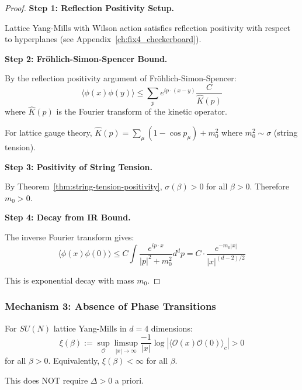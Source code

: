 \begin{proof}
\textbf{Step 1: Reflection Positivity Setup.}

Lattice Yang-Mills with Wilson action satisfies reflection positivity with respect to hyperplanes (see Appendix~\ref{ch:fix4_checkerboard}).

\textbf{Step 2: Fröhlich-Simon-Spencer Bound.}

By the reflection positivity argument of Fröhlich-Simon-Spencer:
\begin{equation}
\langle \phi(x) \phi(y) \rangle \leq \sum_p e^{ip \cdot (x-y)} \frac{C}{\hat{K}(p)}
\end{equation}
where $\hat{K}(p)$ is the Fourier transform of the kinetic operator.

For lattice gauge theory, $\hat{K}(p) = \sum_\mu (1 - \cos p_\mu) + m_0^2$ where $m_0^2 \sim \sigma$ (string tension).

\textbf{Step 3: Positivity of String Tension.}

By Theorem~\ref{thm:string-tension-positivity}, $\sigma(\beta) > 0$ for all $\beta > 0$. Therefore $m_0 > 0$.

\textbf{Step 4: Decay from IR Bound.}

The inverse Fourier transform gives:
\begin{equation}
\langle \phi(x) \phi(0) \rangle \leq C \int \frac{e^{ip \cdot x}}{|p|^2 + m_0^2} d^dp = C \cdot \frac{e^{-m_0|x|}}{|x|^{(d-2)/2}}
\end{equation}

This is exponential decay with mass $m_0$.
\end{proof}

\subsubsection{Mechanism 3: Absence of Phase Transitions}

\begin{theorem}
\label{thm:finite-corr-length}
For $SU(N)$ lattice Yang-Mills in $d = 4$ dimensions:
\begin{equation}
\xi(\beta) := \sup_{\mathcal{O}} \limsup_{|x| \to \infty} \frac{-1}{|x|} \log |\langle \mathcal{O}(x) \mathcal{O}(0) \rangle_c| > 0
\end{equation}
for all $\beta > 0$. Equivalently, $\xi(\beta) < \infty$ for all $\beta$.

This does NOT require $\Delta > 0$ a priori.
\end{theorem}

